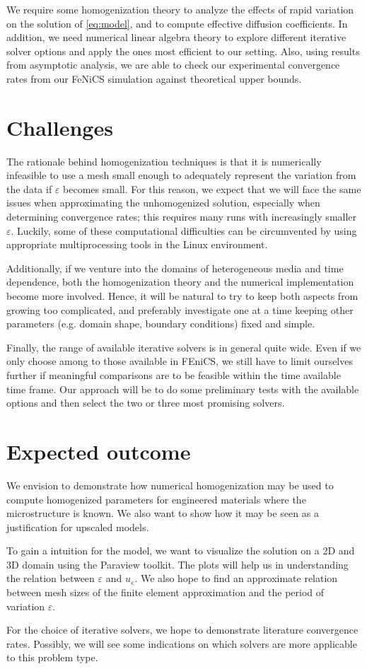 \documentclass{article}
\renewcommand{\epsilon}{\varepsilon}
\begin{document}
We require some homogenization theory to analyze the effects of rapid variation on the solution of \eqref{eq:model}, and to compute effective diffusion coefficients.
In addition, we need numerical linear algebra theory to explore different iterative solver options and apply the ones most efficient to our setting.
Also, using results from asymptotic analysis, we are able to check our experimental convergence rates from our FeNiCS simulation against theoretical upper bounds. 

\section{Challenges}
\label{sec:challenges}
The rationale behind homogenization techniques is that it is numerically infeasible to use a mesh small enough to adequately represent the variation from the data if $\epsilon$ becomes small.
For this reason, we expect that we will face the same issues when approximating the unhomogenized solution, especially when determining convergence rates; this requires many runs with increasingly smaller $\epsilon$. Luckily, some of these computational difficulties can be circumvented by using appropriate multiprocessing tools in the Linux environment.

Additionally, if we venture into the domains of heterogeneous media and time dependence, both the homogenization theory and the numerical implementation become more involved. Hence, it will be natural to try to keep both aspects from growing too complicated, and preferably investigate one at a time keeping other parameters (e.g. domain shape, boundary conditions) fixed and simple.

Finally, the range of available iterative solvers is in general quite wide. Even if we only choose among to those available in FEniCS, we still have to limit ourselves further if meaningful comparisons are to be feasible within the time available time frame. Our approach will be to do some preliminary tests with the available options and then select the two or three most promising solvers.
\section{Expected outcome}
\label{sec:expected_outcome}
We envision to demonstrate how numerical homogenization may be used to compute homogenized parameters for engineered materials where the microstructure is known. We also want to show how it may be seen as a justification for upscaled models.

To gain a intuition for the model, we want to visualize the solution on a 2D and 3D domain using the Paraview toolkit.
The plots will help us in understanding the relation between $\epsilon$ and $u_\varepsilon$.
We also hope to find an approximate relation between mesh sizes of the finite element approximation and the period of variation $\varepsilon$.

For the choice of iterative solvers, we hope to demonstrate literature convergence rates. Possibly, we will see some indications on which solvers are more applicable to this problem type.
\end{document}
